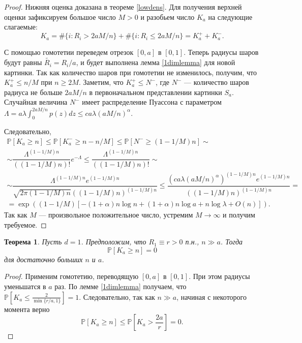 \documentclass[12pt]{article}
\theoremstyle{plain}
\newtheorem{thm}{Теорема} %
\theoremstyle{definition}
\theoremstyle{remark}
\def\geq{\geqslant}
\def\leq{\leqslant}
\newcommand{\PP}{\mathbb{P}}
\newcommand{\til}{\widetilde}
\begin{document}
\begin{proof}
Нижняя оценка доказана в теореме \ref{lowdens}. Для получения верхней оценки зафиксируем большое число $M>0$ и разобьем число $K_a$ на следующие слагаемые:
$$K_a = \#\{i\colon R_i > 2aM/n\} + \#\{i\colon R_i \leq 2aM/n\} = K_a^+ + K_a^-.$$

С помощью гомотетии переведем отрезок $[0,a]$ в $[0,1]$. Теперь радиусы шаров будут равны $\til{R_i} = R_i/a$, и будет выполнена лемма \ref{1dimlemma} для новой картинки. Так как количество шаров при гомотетии не изменилось, получим, что $K_a^+ \leq n/M$ при $n\geq 2M$. Заметим, что $K_a^+ \leq N^-$, где $N^-$ --- количество шаров радиуса не больше $2aM/n$ в первоначальном представлении картинки $S_a$. Случайная величина $N^-$ имеет распределение Пуассона с параметром $\Lambda = a\lambda \int_0^{2aM/n}p(z)dz \leq ca\lambda(aM/n)^\alpha$.

Следовательно, 
\begin{multline*}
    \PP[K_a \geq n] \leq
    \PP[K_a^- \geq n - n/M] \leq 
    \PP[N^- \geq (1-1/M)n] \sim\\\sim
    \dfrac{\Lambda^{(1-1/M)n}}{((1-1/M)n)!}e^{-\Lambda}\leq 
    \dfrac{\Lambda^{(1-1/M)n}}{((1-1/M)n)!}\sim \\\sim
    \dfrac{\Lambda^{(1-1/M)n}e^{(1-1/M)n}}{\sqrt{2\pi (1-1/M)n}((1-1/M)n)^{(1-1/M)n}}\leq 
    \dfrac{(ca\lambda(aM/n)^\alpha)^{(1-1/M)n}e^{(1-1/M)n}}{((1-1/M)n)^{(1-1/M)n}} = \\
    =\exp((1-1/M)[-(1+\alpha)n\log n + (1+\alpha)n\log a + n\log\lambda + O(n)]).
\end{multline*}
Так как $M$ --- произвольное положительное число, устремим $M\to\infty$ и получим требуемое.
\end{proof}

\begin{thm}
Пусть $d=1$. Предположим, что $R_1\equiv r > 0$ п.н.,  $n\gg a$. Тогда $$\PP[K_a \geq n] = 0$$ для достаточно больших $n$ и $a$. 
\end{thm}

\begin{proof}
Применим гомотетию, переводящую $[0,a]$ в $[0,1]$. При этом радиусы уменьшатся в $a$ раз. По лемме \ref{1dimlemma} получаем, что $\PP\left[K_a \leq \frac{2}{\min\{r/a, 1\}}\right] = 1$. Следовательно, так как $n\gg a$, начиная с некоторого момента верно 
\begin{equation*}
    \PP[K_a \geq n] \leqslant
    \PP\left[K_a > \frac{2a}{r}\right] = 0.
\end{equation*}
\end{proof}
\end{document}

